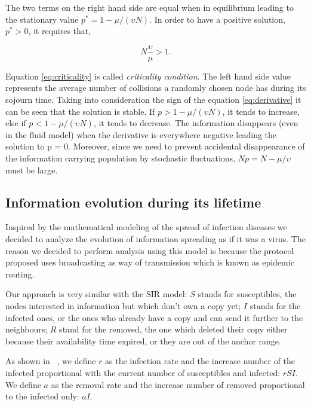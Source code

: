 The two terms on the right hand side are equal when in equilibrium leading to
the stationary value $p^* = 1 - \mu / (\upsilon N)$. In order to have a positive
solution, $p^* > 0$, it requires that,

\begin{equation}
N\frac{\upsilon}{\mu} > 1. \label{eq:criticality}
\end{equation}

Equation \eqref{eq:criticality} is called {\it criticality condition}. The left
hand side value represents the average number of collisions a randomly chosen
node has during its sojourn time. Taking into consideration the sign of
the equation \eqref{eq:derivative} it can be seen that the solution is stable.
If $p > 1 - \mu / (\upsilon N)$, it tends to increase, else if $p < 1 - \mu /
(\upsilon N)$, it tends to decrease. The information disappears (even in the
fluid model) when the derivative is everywhere negative leading the solution to
p = 0. Moreover, since we need to prevent accidental disappearance of the
information carrying population by stochastic fluctuations, $Np = N - \mu /
\upsilon$ must be large.


\subsection{Information evolution during its lifetime}
\label{sec:sir_model}
Inspired by the mathematical modeling of the spread of infection diseases
\cite{hethcote2000mathematics} we decided to analyze the evolution of
information spreading as if it was a virus. The reason we decided to perform
analysis using this model is because the protocol proposed uses broadcasting as
way of transmission which is known as epidemic routing. 

Our approach is very similar with the SIR model: $S$ stands for susceptibles,
the nodes interested in information but which don't own a copy yet; $I$
stands for the infected ones, or the ones who already have a copy and can send
it further to the neighbours; $R$ stand for the removed, the one which deleted
their copy either because their availability time expired, or they are out of
the anchor range.

As shown in ~\cite{hethcote2000mathematics}, we define $r$ as the infection rate
and the increase number of the infected proportional with the current number of 
susceptibles and infected: $rSI$. We define $a$ as the removal rate and the
increase number of removed proportional to the infected only: $aI$.

